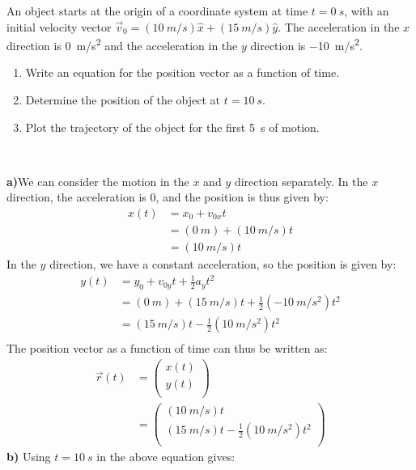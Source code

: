 \begin{example}{An object starts at the origin of a coordinate system at time $t=\SI{0}{s}$, with an initial velocity vector $\vec v_0=(\SI{10}{m/s})\hat x+(\SI{15}{m/s})\hat y$. The acceleration in the $x$ direction is \SI{0}{m/s^2} and the acceleration in the $y$ direction is \SI{-10}{m/s^2}.
\begin{enumerate}[label=(\alph*)]
\item Write an equation for the position vector as a function of time.
\item Determine the position of the object at $t=\SI{10}{s}$.
\item Plot the trajectory of the object for the first \SI{5}{s} of motion.
\end{enumerate}
\ }
\label{ex:DescribingMotionInND:parabola}
\textbf{a)}We can consider the motion in the $x$ and $y$ direction separately. In the $x$ direction, the acceleration is 0, and the position is thus given by:
\begin{align*}
x(t)&=x_0+v_{0x}t\\
&=(\SI{0}{m})+(\SI{10}{m/s})t\\
&=(\SI{10}{m/s})t
\end{align*}
In the $y$ direction, we have a constant acceleration, so the position is given by:
\begin{align*}
y(t) &= y_0+v_{0y}t+\frac{1}{2}a_yt^2\\
&=(\SI{0}{m})+(\SI{15}{m/s})t+\frac{1}{2}(\SI{-10}{m/s^2})t^2\\
&=(\SI{15}{m/s})t-\frac{1}{2}(\SI{10}{m/s^2})t^2\\
\end{align*}
The position vector as a function of time can thus be written as:
\begin{align*}
\vec r(t) &= \begin{pmatrix}
           x(t) \\
           y(t) \\
          \end{pmatrix}\\
          &= \begin{pmatrix}
           (\SI{10}{m/s})t \\
           (\SI{15}{m/s})t-\frac{1}{2}(\SI{10}{m/s^2})t^2 \\
         \end{pmatrix}
\end{align*}
\textbf{b)} Using $t=\SI{10}{s}$ in the above equation gives:
\begin{align*}

\end{align*}
\end{example}
